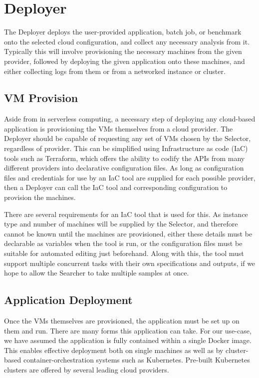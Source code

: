 \documentclass{report}
\begin{document}
\section{Deployer}
The Deployer deploys the user-provided application, batch job, or benchmark onto the selected cloud configuration, and collect any necessary analysis from it. Typically this will involve provisioning the necessary machines from the given provider, followed by deploying the given application onto these machines, and either collecting logs from them or from a networked instance or cluster. 

\subsection{VM Provision}
Aside from in serverless computing, a necessary step of deploying any cloud-based application is provisioning the VMs themselves from a cloud provider. The Deployer should be capable of requesting any set of VMs chosen by the Selector, regardless of provider. This can be simplified using Infrastructure as code (IaC) tools such as Terraform, which offers the ability to codify the APIs from many different providers into declarative configuration files. As long as configuration files and credentials for use by an IaC tool are supplied for each possible provider, then a Deployer can call the IaC tool and corresponding configuration to provision the machines. 

There are several requirements for an IaC tool that is used for this. As instance type and number of machines will be supplied by the Selector, and therefore cannot be known until the machines are provisioned, either these details must be declarable as variables when the tool is run, or the configuration files must be suitable for automated editing just beforehand. Along with this, the tool must support multiple concurrent tasks with their own specifications and outputs, if we hope to allow the Searcher to take multiple samples at once.

\subsection{Application Deployment}
Once the VMs themselves are provisioned, the application must be set up on them and run. There are many forms this application can take. For our use-case, we have assumed the application is fully contained within a single Docker image. This enables effective deployment both on single machines as well as by cluster-based container-orchestration systems such as Kubernetes. Pre-built Kubernetes clusters are offered by several leading cloud providers. 
\end{document}
